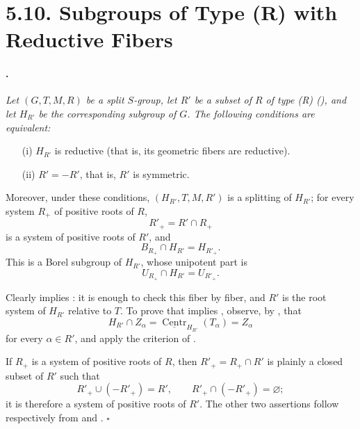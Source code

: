 \section*{5.10. Subgroups of Type \textup{(R)} with Reductive
Fibers}

\paragraph{.}
{\itshape Let \((G,T,M,R)\) be a split \(S\)-group, let \(R'\) be a
subset of \(R\) of type \textup{(R)} \textup{()}, and let
\(H_{R'}\) be the corresponding subgroup of \(G\). The following
conditions are equivalent:
\begin{enumerate}
\item[\textup{\SGAInlineRefTarget{sga3:xxii:prop:5.10.1:item:i}(i)}] \(H_{R'}\) is reductive \textup{(that is, its
geometric fibers are reductive)}.

\item[\textup{\SGAInlineRefTarget{sga3:xxii:prop:5.10.1:item:ii}(ii)}] \(R'=-R'\), that is, \(R'\) is symmetric.
\end{enumerate}
Moreover, under these conditions, \((H_{R'},T,M,R')\) is a
splitting of \(H_{R'}\); for every system \(R_+\) of positive roots
of \(R\),
\[
  R'_+=R'\cap R_+
\]
is a system of positive roots of \(R'\), and
\[
  B_{R_+}\cap H_{R'}=H_{R'_+}.
\]
This is a Borel subgroup of \(H_{R'}\), whose unipotent part is
\[
  U_{R_+}\cap H_{R'}=U_{R'_+}.
\]}

Clearly \textup{} implies \textup{}: it is enough to check
this fiber by fiber, and \(R'\) is the root system of \(H_{R'}\)
relative to \(T\). To prove that \textup{} implies
\textup{}, observe, by , that
\[
  H_{R'}\cap Z_\alpha
  =
  \underline{\operatorname{Centr}}_{H_{R'}}(T_\alpha)
  =
  Z_\alpha
\]
for every \(\alpha\in R'\), and apply the criterion of .

If \(R_+\) is a system of positive roots of \(R\), then
\(R'_+=R_+\cap R'\) is plainly a closed subset of \(R'\) such that
\[
  R'_+\cup(-R'_+)=R',
  \qquad
  R'_+\cap(-R'_+)=\varnothing;
\]
it is therefore a system of positive roots of \(R'\). The other two
assertions follow respectively from \textup{} and
\textup{}.
\hfill\(\square\)

